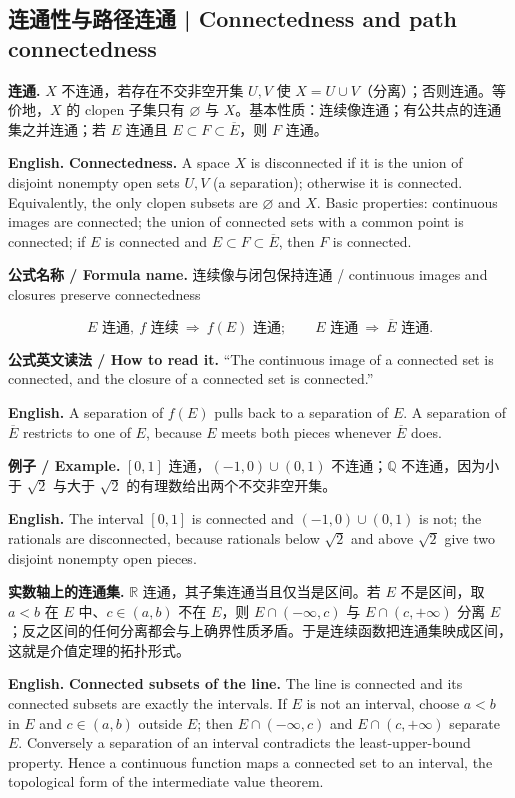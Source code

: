 \documentclass[UTF8,11pt,a4paper]{ctexart}
\newcommand{\EN}[1]{\par\noindent\textbf{English.} #1\par}
\newcommand{\READ}[1]{\par\noindent\textbf{公式英文读法 / How to read it.} #1\par}
\newcommand{\FORMULA}[2]{\par\noindent\textbf{公式名称 / Formula name.} #1 / #2\par}
\newcommand{\EX}[2]{\par\noindent\textbf{例子 / Example.} #1\par\EN{#2}}
\begin{document}
\subsection{连通性与路径连通 | Connectedness and path connectedness}
\noindent\textbf{连通.} $X$ 不连通，若存在不交非空开集 $U,V$ 使 $X=U\cup V$（分离）；否则连通。等价地，$X$ 的 clopen 子集只有 $\varnothing$ 与 $X$。基本性质：连续像连通；有公共点的连通集之并连通；若 $E$ 连通且 $E\subset F\subset\overline E$，则 $F$ 连通。
\EN{\textbf{Connectedness.} A space $X$ is disconnected if it is the union of disjoint nonempty open sets $U,V$ (a separation); otherwise it is connected. Equivalently, the only clopen subsets are $\varnothing$ and $X$. Basic properties: continuous images are connected; the union of connected sets with a common point is connected; if $E$ is connected and $E\subset F\subset\overline E$, then $F$ is connected.}

\FORMULA{连续像与闭包保持连通}{continuous images and closures preserve connectedness}
\[
E\text{ 连通},\ f\text{ 连续}\ \Longrightarrow\ f(E)\text{ 连通};\qquad
E\text{ 连通}\ \Longrightarrow\ \overline E\text{ 连通}.
\]
\READ{``The continuous image of a connected set is connected, and the closure of a connected set is connected.''}
\EN{A separation of $f(E)$ pulls back to a separation of $E$. A separation of $\overline E$ restricts to one of $E$, because $E$ meets both pieces whenever $\overline E$ does.}

\EX{$[0,1]$ 连通，$(-1,0)\cup(0,1)$ 不连通；$\mathbb Q$ 不连通，因为小于 $\sqrt2$ 与大于 $\sqrt2$ 的有理数给出两个不交非空开集。}{The interval $[0,1]$ is connected and $(-1,0)\cup(0,1)$ is not; the rationals are disconnected, because rationals below $\sqrt2$ and above $\sqrt2$ give two disjoint nonempty open pieces.}

\noindent\textbf{实数轴上的连通集.} $\mathbb R$ 连通，其子集连通当且仅当是区间。若 $E$ 不是区间，取 $a<b$ 在 $E$ 中、$c\in(a,b)$ 不在 $E$，则 $E\cap(-\infty,c)$ 与 $E\cap(c,+\infty)$ 分离 $E$；反之区间的任何分离都会与上确界性质矛盾。于是连续函数把连通集映成区间，这就是介值定理的拓扑形式。
\EN{\textbf{Connected subsets of the line.} The line is connected and its connected subsets are exactly the intervals. If $E$ is not an interval, choose $a<b$ in $E$ and $c\in(a,b)$ outside $E$; then $E\cap(-\infty,c)$ and $E\cap(c,+\infty)$ separate $E$. Conversely a separation of an interval contradicts the least-upper-bound property. Hence a continuous function maps a connected set to an interval, the topological form of the intermediate value theorem.}
\end{document}
